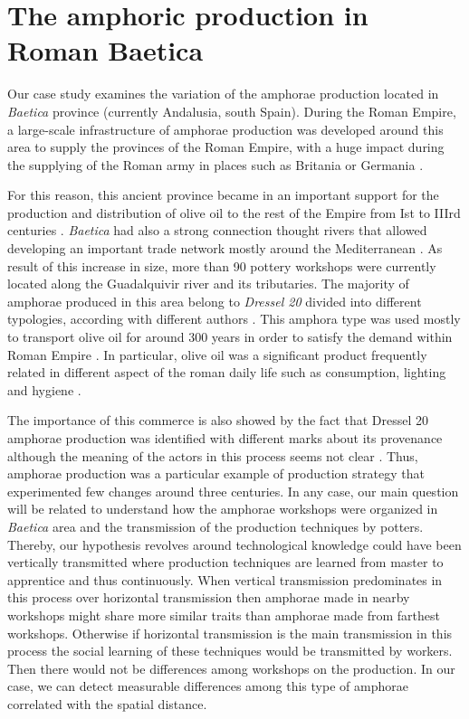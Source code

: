 \documentclass[review]{elsarticle}
\begin{document}
\section{The amphoric production in Roman Baetica}

Our case study examines the variation of the amphorae production located in \emph{Baetica} province (currently Andalusia, south Spain). During the Roman Empire, a large-scale infrastructure of amphorae production was developed around this area to supply the provinces of the Roman Empire, with a huge impact during the supplying of the Roman army in places such as Britania \citep{funari_economic_2005, monfort_britannia_1998} or Germania \citep{remesal_annona_1986}. 

For this reason, this ancient province became in an important support for the production and distribution of olive oil to the rest of the Empire from Ist to IIIrd centuries \citep{chic2005comercio, millet_anforas_1998, rodriguez_baetican_1998}. \emph{Baetica} had also a strong connection thought rivers that allowed developing an important trade network mostly around the Mediterranean \citep{garcia_vargas_enrique_formal_2010}. As result of this increase in size, more than 90 pottery workshops were currently located along the Guadalquivir river and its tributaries. The majority of amphorae produced in this area belong to \emph{Dressel 20} divided into different typologies, according with different authors \citep{berni_millet_epigrafianforica_2008, martin-kilcher_romischen_1994}. 
This amphora type was used mostly to transport olive oil for around 300 years in order to satisfy the demand within Roman Empire \citep{rodriguez_economioleicola_1977}. In particular, olive oil was a significant product frequently related in different aspect of the roman daily life such as consumption, lighting and hygiene \citep{mattingly_d.j._oil_1988}. 

The importance of this commerce is also showed by the fact that Dressel 20 amphorae production was identified with different marks about its provenance although the meaning of the actors in this process seems not clear \citep{coto-sarmiento_maria_bayesian_????}. Thus, amphorae production was a particular example of production strategy that experimented few changes around three centuries. In any case, our main question will be related to understand how the amphorae workshops were organized in \textit{Baetica} area and the transmission of the production techniques by potters. Thereby, our hypothesis revolves around technological knowledge could have been vertically transmitted where production techniques are learned from master to apprentice and thus continuously. When vertical transmission predominates in this process over horizontal transmission then amphorae made in nearby workshops might share more similar traits than amphorae made from farthest workshops. Otherwise if horizontal transmission is the main transmission in this process the social learning of these techniques would be transmitted by workers. Then there would not be differences among workshops on the production. In our case, we can detect measurable differences among this type of amphorae correlated with the spatial distance.
\end{document}
